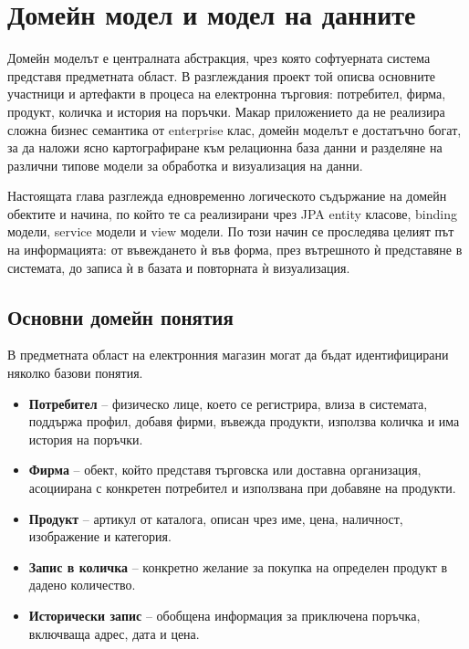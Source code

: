 \section{Домейн модел и модел на данните}

Домейн моделът е централната абстракция, чрез която софтуерната система представя предметната област. В разглеждания проект той описва основните участници и артефакти в процеса на електронна търговия: потребител, фирма, продукт, количка и история на поръчки. Макар приложението да не реализира сложна бизнес семантика от enterprise клас, домейн моделът е достатъчно богат, за да наложи ясно картографиране към релационна база данни и разделяне на различни типове модели за обработка и визуализация на данни.

Настоящата глава разглежда едновременно логическото съдържание на домейн обектите и начина, по който те са реализирани чрез JPA entity класове, binding модели, service модели и view модели. По този начин се проследява целият път на информацията: от въвеждането ѝ във форма, през вътрешното ѝ представяне в системата, до записа ѝ в базата и повторната ѝ визуализация.

\subsection{Основни домейн понятия}

В предметната област на електронния магазин могат да бъдат идентифицирани няколко базови понятия.

\begin{itemize}[leftmargin=*]
    \item \textbf{Потребител} -- физическо лице, което се регистрира, влиза в системата, поддържа профил, добавя фирми, въвежда продукти, използва количка и има история на поръчки.
    \item \textbf{Фирма} -- обект, който представя търговска или доставна организация, асоциирана с конкретен потребител и използвана при добавяне на продукти.
    \item \textbf{Продукт} -- артикул от каталога, описан чрез име, цена, наличност, изображение и категория.
    \item \textbf{Запис в количка} -- конкретно желание за покупка на определен продукт в дадено количество.
    \item \textbf{Исторически запис} -- обобщена информация за приключена поръчка, включваща адрес, дата и цена.
\end{itemize}


